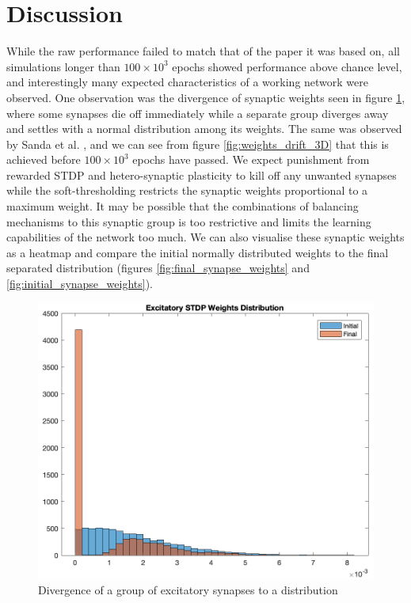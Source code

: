 \documentclass[11pt, twocolumn]{article}
\begin{document}
\section*{Discussion}
While the raw performance failed to match that of the paper it was based on, all simulations longer than $100\times10^3$ epochs showed performance above chance level, and interestingly many expected characteristics of a working network were observed. One observation was the divergence of synaptic weights seen in figure \ref{fig:weights_drift_2D}, where some synapses die off immediately while a separate group diverges away and settles with a normal distribution among its weights. The same was observed by Sanda et al. \cite{sanda2017multi}, and we can see from figure \ref{fig:weights_drift_3D} that this is achieved before $100\times10^3$ epochs have passed. We expect punishment from rewarded \acs{STDP} and hetero-synaptic plasticity to kill off any unwanted synapses while the soft-thresholding restricts the synaptic weights proportional to a maximum weight. It may be possible that the combinations of balancing mechanisms to this synaptic group is too restrictive and limits the learning capabilities of the network too much. We can also visualise these synaptic weights as a heatmap and compare the initial normally distributed weights to the final separated distribution (figures \ref{fig:final_synapse_weights} and \ref{fig:initial_synapse_weights}).
\begin{figure}[H]
	\centering
	\includegraphics[width=\linewidth]{weights_drift_2D}
	\caption{Divergence of a group of excitatory synapses to a distribution}
	\label{fig:weights_drift_2D}
\end{figure}
\end{document}
